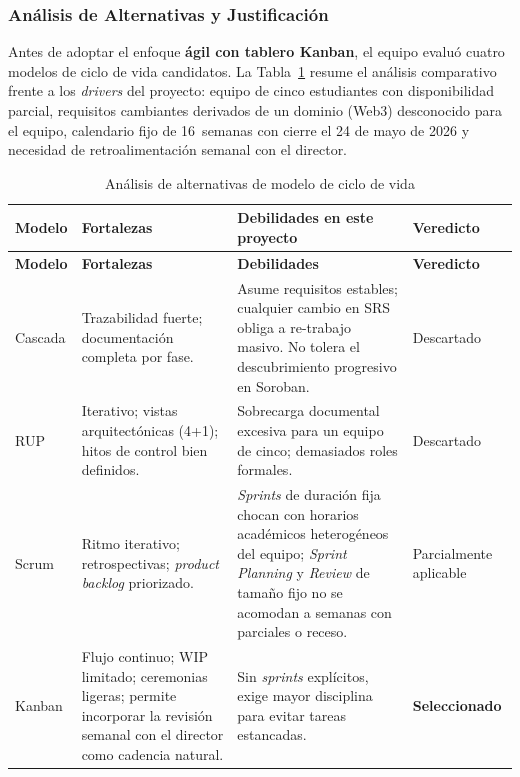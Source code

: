 \documentclass[12pt,oneside]{report}
\begin{document}
      \subsubsection{Análisis de Alternativas y Justificación}
      \label{subsubsec:analisis-ciclo-vida}

      Antes de adoptar el enfoque \textbf{ágil con tablero Kanban}, el equipo evaluó cuatro modelos de ciclo de vida candidatos. La Tabla~\ref{tab:alt-ciclo-vida} resume el análisis comparativo frente a los \textit{drivers} del proyecto: equipo de cinco estudiantes con disponibilidad parcial, requisitos cambiantes derivados de un dominio (Web3) desconocido para el equipo, calendario fijo de 16~semanas con cierre el 24 de mayo de 2026 y necesidad de retroalimentación semanal con el director.

      \begin{longtable}{@{}p{3.0cm} p{4.5cm} p{4.0cm} p{3.0cm}@{}}
        \caption{Análisis de alternativas de modelo de ciclo de vida}
        \label{tab:alt-ciclo-vida}\\
        \toprule
        \textbf{Modelo} & \textbf{Fortalezas} & \textbf{Debilidades en este proyecto} & \textbf{Veredicto}\\
        \midrule
        \endfirsthead
        \toprule
        \textbf{Modelo} & \textbf{Fortalezas} & \textbf{Debilidades} & \textbf{Veredicto}\\
        \midrule
        \endhead
        \bottomrule
        \endfoot
        Cascada \cite{royce1970} & Trazabilidad fuerte; documentación completa por fase. & Asume requisitos estables; cualquier cambio en SRS obliga a re-trabajo masivo. No tolera el descubrimiento progresivo en Soroban. & Descartado\\
        RUP \cite{kruchten2003} & Iterativo; vistas arquitectónicas (4+1); hitos de control bien definidos. & Sobrecarga documental excesiva para un equipo de cinco; demasiados roles formales. & Descartado\\
        Scrum \cite{schwaber2020} & Ritmo iterativo; retrospectivas; \textit{product backlog} priorizado. & \textit{Sprints} de duración fija chocan con horarios académicos heterogéneos del equipo; \textit{Sprint Planning} y \textit{Review} de tamaño fijo no se acomodan a semanas con parciales o receso. & Parcialmente aplicable\\
        Kanban \cite{anderson2010,brechner2015} & Flujo continuo; WIP limitado; ceremonias ligeras; permite incorporar la revisión semanal con el director como cadencia natural. & Sin \textit{sprints} explícitos, exige mayor disciplina para evitar tareas estancadas. & \textbf{Seleccionado}\\
      \end{longtable}
\end{document}
